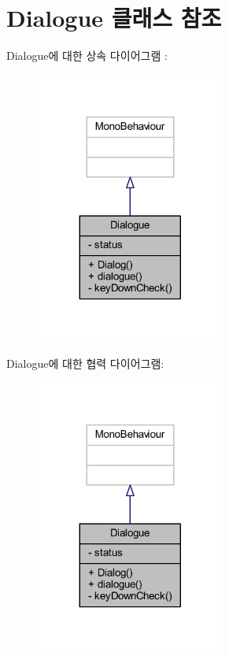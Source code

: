 \hypertarget{class_dialogue}{}\section{Dialogue 클래스 참조}
\label{class_dialogue}


Dialogue에 대한 상속 다이어그램 \+: \nopagebreak
\begin{figure}[H]
\begin{center}
\leavevmode
\includegraphics[width=176pt]{d6/d0c/class_dialogue__inherit__graph}
\end{center}
\end{figure}


Dialogue에 대한 협력 다이어그램\+:\nopagebreak
\begin{figure}[H]
\begin{center}
\leavevmode
\includegraphics[width=176pt]{dc/d3f/class_dialogue__coll__graph}
\end{center}
\end{figure}
